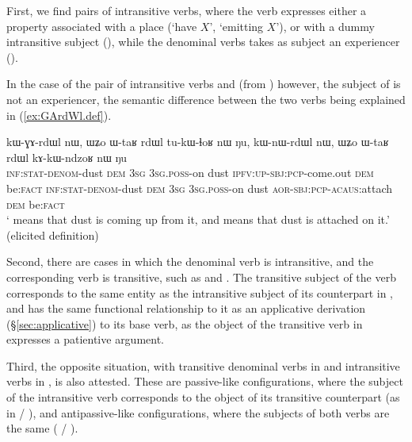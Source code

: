 First, we find pairs of intransitive verbs, where the  verb expresses either a property associated with a place (`have $X$',  `emitting $X$'), or with a dummy intransitive subject (), while the   denominal verbs takes as subject an experiencer (). 

In the case of  the pair of intransitive verbs  and  (from ) however, the subject of  is not an experiencer, the semantic difference between the two verbs being explained in (\ref{ex:GArdWl.def}).
 
 \begin{exe}
\ex \label{ex:GArdWl.def}
\gll kɯ-ɣɤ-rdɯl nɯ, ɯʑo ɯ-taʁ rdɯl tu-kɯ-ɬoʁ nɯ ŋu, kɯ-nɯ-rdɯl nɯ, ɯʑo ɯ-taʁ rdɯl kɤ-kɯ-ndzoʁ nɯ ŋu \\
\textsc{inf}:\textsc{stat}-\textsc{denom}-dust \textsc{dem} \textsc{3sg}  \textsc{3sg}.\textsc{poss}-on dust \textsc{ipfv}:\textsc{up}-\textsc{sbj}:\textsc{pcp}-come.out \textsc{dem} be:\textsc{fact} \textsc{inf}:\textsc{stat}-\textsc{denom}-dust \textsc{dem} \textsc{3sg}  \textsc{3sg}.\textsc{poss}-on dust \textsc{aor}-\textsc{sbj}:\textsc{pcp}-\textsc{acaus}:attach \textsc{dem} be:\textsc{fact} \\
\glt ` means that dust is coming up from it, and  means that dust is attached on it.' (elicited definition)
\end{exe} 
  
 Second, there are cases in which the   denominal verb is intransitive, and the corresponding   verb is transitive, such as  and  . The transitive subject of the   verb corresponds to the same entity as the intransitive subject of its counterpart in , and has the same functional relationship to it as an applicative derivation (§\ref{sec:applicative}) to its base verb, as the object of the transitive verb in  expresses a patientive argument.
  
Third,  the opposite situation, with transitive denominal verbs in   and intransitive verbs in , is also attested. These are passive-like configurations, where the subject of the intransitive verb corresponds to the object of its transitive counterpart (as in  / ), and antipassive-like configurations, where the subjects of both verbs are the same ( / ).
   

